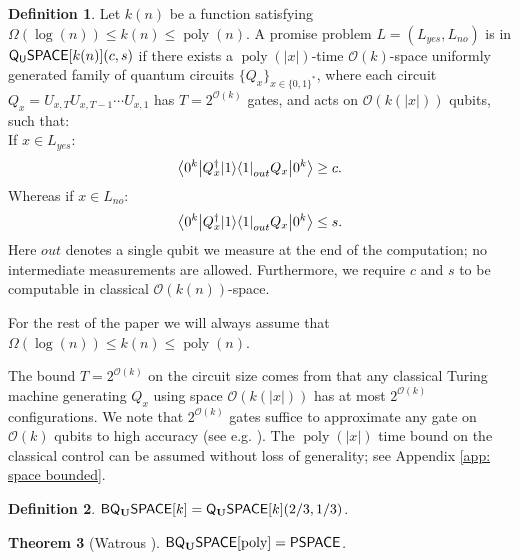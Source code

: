 \documentclass[11pt]{article}
\newtheorem{theorem}{Theorem}
\theoremstyle{definition}
\newtheorem{definition}[theorem]{Definition}
\theoremstyle{remark}
\newcommand\QSPACE{{\sf{Q_{U}SPACE}}}
\newcommand\PQSPACE{{\sf{PQ_{U}SPACE}}}
\newcommand\PSPACE{{\sf{PSPACE}}}
\newcommand{\classfont}{\sf}
\newcommand{\Unitary}{\mathbf{U}}
\newcommand{\unitaryQSPACE}[3]{{\classfont{Q}_\Unitary\classfont{SPACE}}[#1](#2,#3)}
\newcommand{\unitaryBQSPACE}[1]{{\classfont{BQ}_\Unitary\classfont{SPACE}}[#1]}
\newcommand\bigoh{\mathcal{O}}
\DeclareMathOperator{\poly}{poly}
\begin{document}
\begin{definition} \label{def: qspace}
Let $k(n)$ be a function satisfying $\Omega(\log(n)) \le k(n) \le \poly(n)$. A promise problem $L=(L_{yes},L_{no})$ is in $\QSPACE[k(n)](c,s)$ if there exists a $\poly(|x|)$-time $\mathcal{O}(k)$-space uniformly generated family of quantum circuits $\{Q_x\}_{x\in\{0,1\}^*}$, where each circuit $Q_x=U_{x,T}U_{x,T-1}\cdots U_{x,1}$ has $T=2^{\mathcal{O}(k)}$ gates, and acts on $\mathcal{O}(k(|x|))$ qubits, such that:\\
 If $x \in L_{yes}$:
\begin{equation}
{\left\langle{0^k}\right\vert} Q^\dagger_x {\left\vert{1}\right\rangle}{\left\langle{1}\right\vert}_{out} Q_x {\left\vert{0^k}\right\rangle} \ge c.
\end{equation}
Whereas if $x \in L_{no}$:
\begin{equation}
{\left\langle{0^k}\right\vert} Q^\dagger_x {\left\vert{1}\right\rangle}{\left\langle{1}\right\vert}_{out} Q_x {\left\vert{0^k}\right\rangle} \le s.
\end{equation}
Here $out$ denotes a single qubit we measure at the end of the computation; no intermediate measurements are allowed.  
Furthermore, we require $c$ and $s$ to be computable in classical $\bigoh(k(n))$-space.
\end{definition}

For the rest of the paper we will always assume that $\Omega(\log(n)) \le k(n) \le \poly(n)$.

The bound $T=2^{\mathcal{O}(k)}$ on the circuit size comes from that any classical Turing machine generating $Q_x$ using space $\bigoh(k(|x|))$ has at most $2^{\mathcal{O}(k)}$ configurations. We note that $2^{\mathcal{O}(k)}$ gates suffice to approximate any gate on $\bigoh(k)$ qubits to high accuracy (see e.g. \cite[Chapter~4]{nc00}). The $\poly(|x|)$ time bound on the classical control can be assumed without loss of generality; see Appendix \ref{app: space bounded}.

\begin{definition} $\unitaryBQSPACE{k}=\unitaryQSPACE{k}{2/3}{1/3}$.\end{definition}
\begin{theorem}[Watrous \cite{Watrous99,Watrous03}]\label{thm:pqpspace} $\unitaryBQSPACE{\poly}=\PSPACE$.
\end{theorem}
\end{document}
